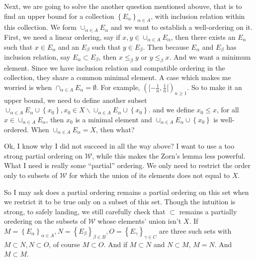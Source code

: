 Next, we are going to solve the another question mentioned abouve, that is to find an upper bound for a collection $\left\{E_{\alpha}\right\}_{\alpha\in A}$, with inclusion relation within this collection. We form $\cup_{\alpha\in A}E_{\alpha}$ and we want to establish a well-ordering on it. First, we need a linear ordering, say if $x,y\in \cup_{\alpha\in A}E_{\alpha}$, then there exists an $E_{\alpha}$ such that $x\in E_{\alpha}$ and an $E_{\beta}$ such that $y\in E_{\beta}$. Then because $E_{\alpha}$ and $E_{\beta}$ has inclusion relation, say $E_{\alpha}\subset E_{\beta}$, then $x\le_{\beta} y$ or $y\le_{\beta} x$. And we want a minimum element. Since we have inclusion relation and compatible ordering in the collection, they share a common minimal element. A case which makes me worried is when $\cap_{\alpha\in A}E_{\alpha}=\emptyset$. For example, $([-\frac{1}{n},\frac{1}{n}[)_{n\ge 1}$. So to make it an upper bound, we need to define another subset $\cup_{\alpha\in A}E_{\alpha}\cup\left\{x_0\right\},x_0\in X\backslash \cup_{\alpha\in A}E_{\alpha}\cup\left\{x_0\right\}$. and we define $x_0\le x$, for all $x\in \cup_{\alpha\in A}E_{\alpha}$, then $x_0$ is a minimal element and $\cup_{\alpha\in A}E_{\alpha}\cup\left\{x_0\right\}$ is well-ordered. When $\cup_{\alpha\in A}E_{\alpha}=X$, then what?

Ok, I know why I did not succeed in all the way above? I want to use a too strong partial ordering on $\mathcal{W}$, while this makes the Zorn's lemma less powerful. What I need is really some “partial” ordering. We only need to restrict the order only to subsets of $\mathcal{W}$ for which the union of its elements does not equal to $X$.

So I may ask does a partial ordering remains a partial ordering on this set when we restrict it to be true only on a subset of this set. Though the intuition is strong, to safely landing, we still carefully check that $\subset$ remains a partially oredering on the subsets of $\mathcal{W}$ whose elements' union isn't $X$. If $M=\left\{E_{\alpha}\right\}_{\alpha\in A},N=\left\{E_{\beta}\right\}_{\beta\in B},O=\left\{E_{\gamma}\right\}_{\gamma\in C}$ are three such sets with $M\subset N,N\subset O$, of course $M\subset O$. And if $M\subset N$ and $N\subset M$, $M=N$. And $M\subset M$.